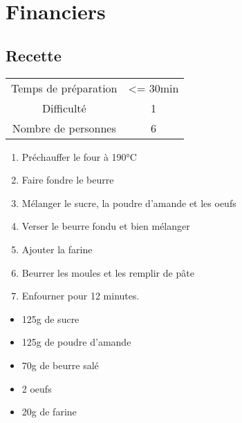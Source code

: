 \newpage
\section{Financiers}
    \label{sec:Financiers}
    \subsection{Recette}
    \vspace{1cm}


    \begin{center}
        \begin{tabular}{c|c}
            Temps de préparation & <= 30min \\
            Difficulté & 1 \\
            Nombre de personnes & 6 
        \end{tabular}
    \end{center}{}

    \vspace{1cm}
    \hline
    \vspace{1cm}

    \begin{minipage}{.7\textwidth}
        \begin{enumerate}
            \item Préchauffer le four à 190°C
	    \item Faire fondre le beurre
	    \item Mélanger le sucre, la poudre d'amande et les oeufs
	    \item Verser le beurre fondu et bien mélanger
	    \item Ajouter la farine
	    \item Beurrer les moules et les remplir de pâte
	    \item  Enfourner pour 12 minutes.

        \end{enumerate}
    \end{minipage}
    \begin{minipage}{.3\textwidth}
        \begin{flushleft}
        \begin{itemize}
            \item 125g de sucre
	    \item 125g de poudre d'amande
	    \item 70g de beurre salé
	    \item 2 oeufs
	    \item 20g de farine

        \end{itemize}
        \end{flushleft}
    \end{minipage}
    
